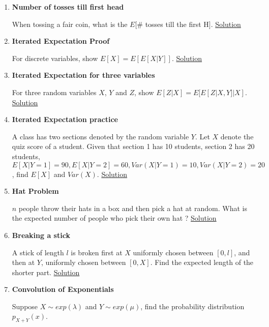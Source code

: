 \documentclass[../probability-notes.tex]{subfiles}
\begin{document}
\begin{enumerate}
    \item \hypertarget{q_tossh}{\textbf{Number of tosses till first head}}\newline
    When tossing a fair coin, what is the $E[$\# tosses till the first H$]$. \hyperlink{a_tossh}{Solution}
    
    \item \hypertarget{q_itrexpproof}{\textbf{Iterated Expectation Proof}}\newline
    For discrete variables, show $E[X] = E[E[X|Y]]$. \hyperlink{a_itrexpproof}{Solution}
    
    \item \hypertarget{q_itrexpthree}{\textbf{Iterated Expectation for three variables}}\newline
    For three random variables $X$, $Y$ and $Z$, show $E[Z|X] = E[E[Z|X,Y]|X]$. \hyperlink{a_itrexpthree}{Solution}
    
    \item \hypertarget{q_itrexppractice}{\textbf{Iterated Expectation practice}}\newline
    A class has two sections denoted by the random variable $Y$. Let $X$ denote the quiz score of a student. Given that section 1 has 10 students, section 2 has 20 students, $E[X|Y=1] = 90, E[X|Y=2] = 60, Var(X|Y=1) = 10, Var(X|Y=2) = 20$, find $E[X]$ and $Var(X)$. \hyperlink{a_itrexppractice}{Solution}

    \item \hypertarget{q_hatproblem}{\textbf{Hat Problem}}\newline
    $n$ people throw their hats in a box and then pick a hat at random. What is the expected number of people who pick their own hat ? \hyperlink{a_hatproblem}{Solution}
    
    \item \hypertarget{q_breakstick}{\textbf{Breaking a stick}}\newline
    A stick of length $l$ is broken first at $X$ uniformly chosen between $[0,l]$, and then at $Y$, uniformly chosen between $[0,X]$. Find the expected length of the shorter part. \hyperlink{a_breakstick}{Solution}

    
    \item \hypertarget{q_convexp}{\textbf{Convolution of Exponentials}}\newline
    Suppose $X \sim exp(\lambda)$ and $Y \sim exp(\mu)$, find the probability distribution $p_{X+Y}(x)$.



\end{enumerate}
\end{document}
